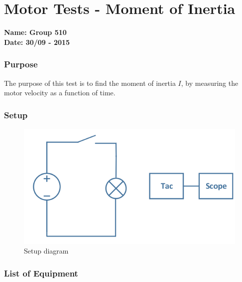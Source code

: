 \pagebreak
\section{Motor Tests - Moment of Inertia} \label{app:motorTestMomentOfInertia}
\textbf{Name: Group 510}\\
\textbf{Date: 30/09 - 2015}

\subsubsection{Purpose}
The purpose of this test is to find the moment of inertia $I$, by measuring the motor velocity as a function of time.

\subsubsection{Setup}
\begin{figure}[H]
  \centering
	\includegraphics[scale=0.5]{figures/MotorTest8.png}
	\caption{Setup diagram}
\end{figure}\vspace{-5mm}

\subsubsection{List of Equipment}

